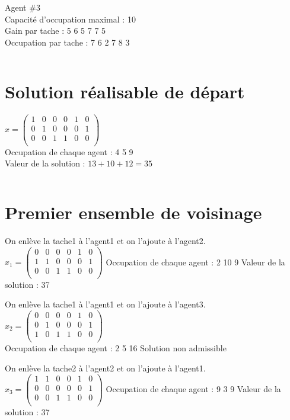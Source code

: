\documentclass[a4paper,12pt,titlepage]{report}
\begin{document}
Agent \#3\\
Capacité d'occupation maximal : 10\\
Gain par tache : 		5	6	5	7	7	5\\
Occupation par tache :	7	6	2	7	8	3

$ $

\section{Solution réalisable de départ}

$x = \begin{pmatrix}
 1&0&0&0&1&0 \\
 0&1&0&0&0&1 \\
 0&0&1&1&0&0 \\
\end{pmatrix}$\\
Occupation de chaque agent : 4 5 9\\
Valeur de la solution : $13 + 10 + 12 = 35$


$ $









\section{Premier ensemble de voisinage}

On enlève la tache1 à l'agent1 et on l'ajoute à l'agent2.
$x_{1} = \begin{pmatrix}
 0&0&0&0&1&0 \\
 1&1&0&0&0&1 \\
 0&0&1&1&0&0 \\
\end{pmatrix}$
Occupation de chaque agent : 2 10 9
Valeur de la solution : 37

On enlève la tache1 à l'agent1 et on l'ajoute à l'agent3.
$x_{2} = \begin{pmatrix}
 0&0&0&0&1&0 \\
 0&1&0&0&0&1 \\
 1&0&1&1&0&0 \\
\end{pmatrix}$\\
Occupation de chaque agent : 2 5 16
Solution non admissible

On enlève la tache2 à l'agent2 et on l'ajoute à l'agent1.
$x_{3} = \begin{pmatrix}
 1&1&0&0&1&0 \\
 0&0&0&0&0&1 \\
 0&0&1&1&0&0 \\
\end{pmatrix}$
Occupation de chaque agent : 9 3 9
Valeur de la solution : 37
\end{document}
